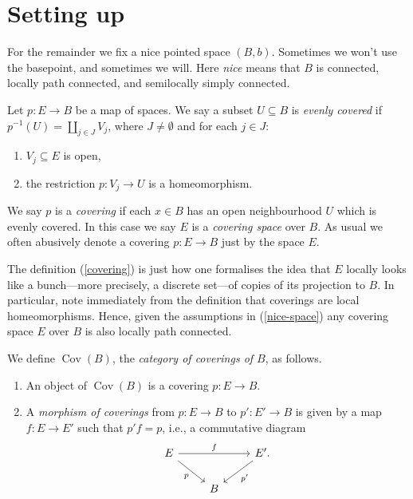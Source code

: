 
\section{Setting up}

\begin{nothing}
  \label{nice-space}
  For the remainder we fix a nice pointed space $(B,b)$. Sometimes we
  won't use the basepoint, and sometimes we will. Here \emph{nice}
  means that $B$ is connected, locally path connected, and semilocally
  simply connected.
\end{nothing}

\begin{definition}
  \label{covering}
  Let $p : E \to B$ be a map of spaces. We say a subset $U \subseteq
  B$ is \emph{evenly covered} if $p^{-1}(U) = \coprod_{j \in J} V_j$,
  where $J \ne \emptyset$ and for each $j \in J$:
  \begin{enumerate}
  \item $V_j \subseteq E$ is open,
  \item the restriction $p : V_j \to U$ is a homeomorphism.
  \end{enumerate}
  We say $p$ is a \emph{covering} if each $x \in B$ has an open
  neighbourhood $U$ which is evenly covered. In this case we say $E$
  is a \emph{covering space} over $B$. As usual we often abusively
  denote a covering $p : E \to B$ just by the space $E$.
\end{definition}

\begin{remarks}
  \label{covering-rmk}
  The definition (\ref{covering}) is just how one formalises the idea
  that $E$ locally looks like a bunch---more precisely, a discrete
  set---of copies of its projection to $B$. In particular, note
  immediately from the definition that coverings are local
  homeomorphisms. Hence, given the assumptions in (\ref{nice-space})
  any covering space $E$ over $B$ is also locally path connected.
\end{remarks}

\newcommand{\Cov}{\operatorname{Cov}}
\newcommand{\Gal}{\operatorname{Gal}}

\begin{definition}
  \label{cover-category}
  We define $\Cov(B)$, the \emph{category of coverings of $B$}, as
  follows.
  \begin{enumerate}
  \item An object of $\Cov(B)$ is a covering $p : E \to B$.
  \item \label{cover-morphism} A \emph{morphism of coverings} from $p
    : E \to B$ to $p' : E' \to B$ is given by a map $f : E \to E'$
    such that $p'f = p$, i.e., a commutative diagram
    \[
    \begin{tikzcd}
      E \ar{rr}{f} \drar[swap]{p} & & E'. \dlar{p'} \\ & B &
    \end{tikzcd}
    \]
  \end{enumerate}
\end{definition}

